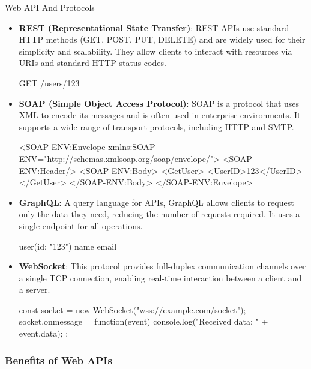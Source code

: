 \begin{notes}{Web API And Protocols}
\begin{highlight}
        \begin{itemize}
            \item \textbf{REST (Representational State Transfer)}: REST APIs use standard HTTP methods (GET, POST, PUT, DELETE) and are widely used for their simplicity and scalability. They allow 
            clients to interact with resources via URIs and standard HTTP status codes.
    \begin{code}[Example]
    GET /users/123
    \end{code}
            \item \textbf{SOAP (Simple Object Access Protocol)}: SOAP is a protocol that uses XML to encode its messages and is often used in enterprise environments. It supports a wide range of 
            transport protocols, including HTTP and SMTP.
    \begin{code}
    <SOAP-ENV:Envelope xmlns:SOAP-ENV="http://schemas.xmlsoap.org/soap/envelope/">
        <SOAP-ENV:Header/>
        <SOAP-ENV:Body>
            <GetUser>
                <UserID>123</UserID>
            </GetUser>
        </SOAP-ENV:Body>
    </SOAP-ENV:Envelope>
    \end{code}
            \item \textbf{GraphQL}: A query language for APIs, GraphQL allows clients to request only the data they need, reducing the number of requests required. It uses a single endpoint for all operations.
    \begin{code}[Example]
    {
        user(id: "123") {
        name
        email
        }
    }
    \end{code}
    \item \textbf{WebSocket}: This protocol provides full-duplex communication channels over a single TCP connection, enabling real-time interaction between a client and a server.
    \begin{code}[JavaScript]
    const socket = new WebSocket("wss://example.com/socket");
    socket.onmessage = function(event) {
        console.log("Received data: " + event.data);
    };
    \end{code}
        \end{itemize}
    
    \end{highlight}
    
    \subsubsection*{Benefits of Web APIs}
    

\end{notes}
